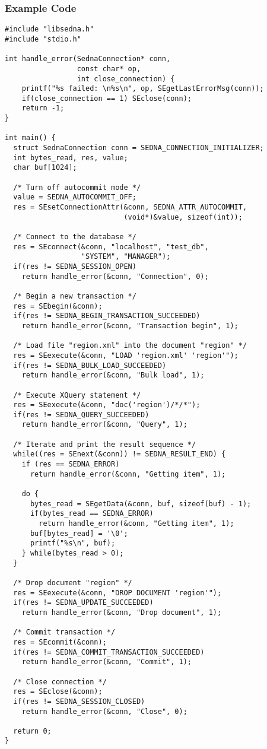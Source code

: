 \documentclass[a4paper,12pt]{article}
\begin{document}
\subsubsection{Example Code}

\small{
\begin{verbatim}
#include "libsedna.h"
#include "stdio.h"

int handle_error(SednaConnection* conn,
                 const char* op,
                 int close_connection) {
    printf("%s failed: \n%s\n", op, SEgetLastErrorMsg(conn));
    if(close_connection == 1) SEclose(conn);
    return -1;
}

int main() {
  struct SednaConnection conn = SEDNA_CONNECTION_INITIALIZER;
  int bytes_read, res, value;
  char buf[1024];

  /* Turn off autocommit mode */
  value = SEDNA_AUTOCOMMIT_OFF;
  res = SEsetConnectionAttr(&conn, SEDNA_ATTR_AUTOCOMMIT,
                            (void*)&value, sizeof(int));

  /* Connect to the database */
  res = SEconnect(&conn, "localhost", "test_db",
                  "SYSTEM", "MANAGER");
  if(res != SEDNA_SESSION_OPEN)
    return handle_error(&conn, "Connection", 0);

  /* Begin a new transaction */
  res = SEbegin(&conn);
  if(res != SEDNA_BEGIN_TRANSACTION_SUCCEEDED)
    return handle_error(&conn, "Transaction begin", 1);

  /* Load file "region.xml" into the document "region" */
  res = SEexecute(&conn, "LOAD 'region.xml' 'region'");
  if(res != SEDNA_BULK_LOAD_SUCCEEDED)
    return handle_error(&conn, "Bulk load", 1);

  /* Execute XQuery statement */
  res = SEexecute(&conn, "doc('region')/*/*");
  if(res != SEDNA_QUERY_SUCCEEDED)
    return handle_error(&conn, "Query", 1);

  /* Iterate and print the result sequence */
  while((res = SEnext(&conn)) != SEDNA_RESULT_END) {
    if (res == SEDNA_ERROR)
      return handle_error(&conn, "Getting item", 1);

    do {
      bytes_read = SEgetData(&conn, buf, sizeof(buf) - 1);
      if(bytes_read == SEDNA_ERROR)
        return handle_error(&conn, "Getting item", 1);
      buf[bytes_read] = '\0';
      printf("%s\n", buf);
    } while(bytes_read > 0);
  }

  /* Drop document "region" */
  res = SEexecute(&conn, "DROP DOCUMENT 'region'");
  if(res != SEDNA_UPDATE_SUCCEEDED)
    return handle_error(&conn, "Drop document", 1);

  /* Commit transaction */
  res = SEcommit(&conn);
  if(res != SEDNA_COMMIT_TRANSACTION_SUCCEEDED)
    return handle_error(&conn, "Commit", 1);

  /* Close connection */
  res = SEclose(&conn);
  if(res != SEDNA_SESSION_CLOSED)
    return handle_error(&conn, "Close", 0);

  return 0;
}
\end{verbatim}}
\end{document}
